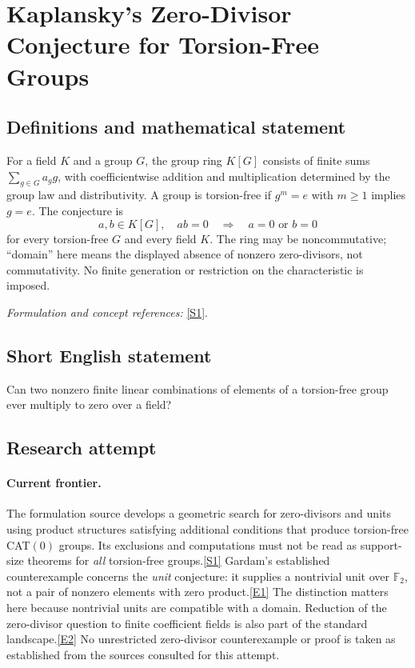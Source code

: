 \documentclass[11pt,a4paper]{article}
\newcommand{\F}{\mathbb{F}}
\newcommand{\sref}[2]{\hyperlink{source:#1:#2}{[S#2]}}
\newcommand{\eref}[2]{\hyperlink{extra:#1:#2}{[E#2]}}
\newif\ifshowcatalogue
\newcommand{\cataloguescope}[1]{\ifshowcatalogue
 \paragraph{Exact scope in the supplied catalogue.}
 \begin{quote}\small #1\end{quote}\fi}
\begin{document}
\setcounter{section}{0}
\clearpage
\section*{\texorpdfstring{Kaplansky's Zero-Divisor Conjecture for Torsion-Free Groups}{Kaplansky's Zero-Divisor Conjecture for Torsion-Free Groups}}\label{30006789}
\subsection{Definitions and mathematical statement}
For a field $K$ and a group $G$, the group ring $K[G]$ consists of finite sums $\sum_{g\in G}a_gg$, with coefficientwise addition and multiplication determined by the group law and distributivity. A group is torsion-free if $g^m=e$ with $m\ge1$ implies $g=e$. The conjecture is
\[
 a,b\in K[G],\quad ab=0\quad\Longrightarrow\quad a=0\text{ or }b=0
\]
for every torsion-free $G$ and every field $K$. The ring may be noncommutative; ``domain'' here means the displayed absence of nonzero zero-divisors, not commutativity. No finite generation or restriction on the characteristic is imposed.
\par\smallskip\textit{Formulation and concept references:} \sref{30006789}{1}.
\cataloguescope{Prove that for every torsion-free group G and every field K, the group ring K[G] has no non-trivial zero-divisors, i.e. K[G] is a domain.}
\subsection{Short English statement}
Can two nonzero finite linear combinations of elements of a torsion-free group ever multiply to zero over a field?
\subsection{Research attempt}

\paragraph{Current frontier.}
The formulation source develops a geometric search for zero-divisors and
units using product structures satisfying additional conditions that
produce torsion-free CAT$(0)$ groups. Its exclusions and computations
must not be read as support-size theorems for \emph{all} torsion-free
groups.\sref{30006789}{1}
Gardam's established counterexample concerns the \emph{unit} conjecture:
it supplies a nontrivial unit over $\F_2$, not a pair of nonzero elements
with zero product.\eref{30006789}{1}
The distinction matters here because nontrivial units are compatible with
a domain. Reduction of the zero-divisor question to finite coefficient
fields is also part of the standard landscape.\eref{30006789}{2}
No unrestricted zero-divisor counterexample or proof is taken as established
from the sources consulted for this attempt.
\end{document}
